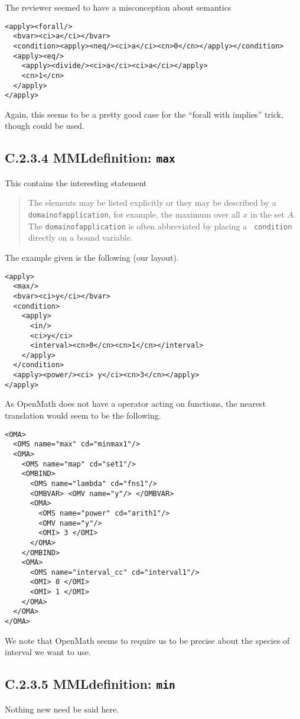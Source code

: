 \documentclass{llncs}
\begin{document}
\begin{newpart}{The reviewer seemed to have a misconception about semantics}
\begin{lstlisting}[language=MathML2]
<apply><forall/>
  <bvar><ci>a</ci></bvar>
  <condition><apply><neq/><ci>a</ci><cn>0</cn></apply></condition>
  <apply><eq/>
    <apply><divide/><ci>a</ci><ci>a</ci></apply>
    <cn>1</cn>
  </apply>
</apply>
\end{lstlisting}
Again, this seems to be a pretty good case for the ``forall with implies''
trick, though {} could be used.
\subsection{C.2.3.4 MMLdefinition: {\tt max}}\label{C234}
This contains the interesting statement
\begin{quotation}\noindent
The elements may be listed explicitly or they may be described by a {\tt
domainofapplication}, for example, the maximum over all $x$ in the set $A$.
The {\tt domainofapplication} is often abbreviated by placing a {\tt
condition} directly on a bound variable. 
\end{quotation}
The example given is the following (our layout).
\begin{lstlisting}[language=MathML2]
<apply>
  <max/>
  <bvar><ci>y</ci></bvar>
  <condition>
    <apply>
      <in/>
      <ci>y</ci>
      <interval><cn>0</cn><cn>1</cn></interval>
    </apply>
  </condition>
  <apply><power/><ci> y</ci><cn>3</cn></apply>
</apply>
\end{lstlisting}
As OpenMath does not have a {} operator acting on functions,
the nearest translation would seem to be the following.
\begin{lstlisting} 
<OMA>
  <OMS name="max" cd="minmax1"/>
  <OMA>
    <OMS name="map" cd="set1"/>
    <OMBIND>
      <OMS name="lambda" cd="fns1"/>
      <OMBVAR> <OMV name="y"/> </OMBVAR>
      <OMA>
        <OMS name="power" cd="arith1"/>
        <OMV name="y"/>
        <OMI> 3 </OMI>
      </OMA>
    </OMBIND>
    <OMA>
      <OMS name="interval_cc" cd="interval1"/>
      <OMI> 0 </OMI>
      <OMI> 1 </OMI>
    </OMA>
  </OMA>
</OMA>
\end{lstlisting}
We note that OpenMath seems to require us to be precise about the species of
interval we want to use.
\subsection{C.2.3.5 MMLdefinition: {\tt min}}\label{C235}
Nothing new need be said here.

\end{newpart}
\end{document}
